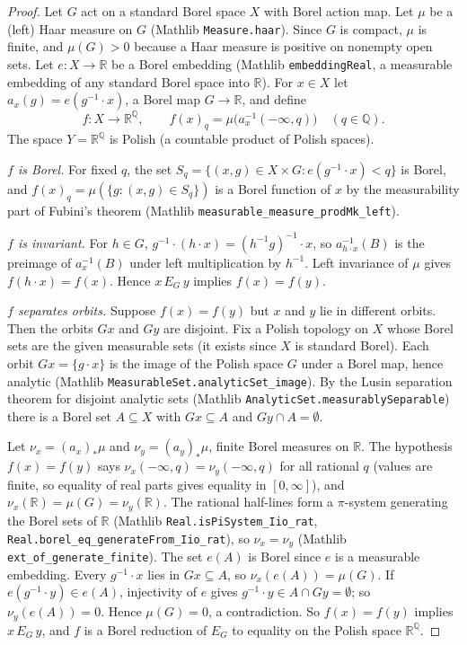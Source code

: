 \documentclass[11pt]{article}
\theoremstyle{definition}
\begin{document}
\begin{proof}
Let $G$ act on a standard Borel space $X$ with Borel action map. Let $\mu$ be a (left) Haar measure
on $G$ (Mathlib \texttt{Measure.haar}). Since $G$ is compact, $\mu$ is finite, and $\mu(G)>0$
because a Haar measure is positive on nonempty open sets. Let $e:X\to\mathbb R$ be a Borel embedding
(Mathlib \texttt{embeddingReal}, a measurable embedding of any standard Borel space into
$\mathbb R$). For $x\in X$ let $a_x(g)=e(g^{-1}\cdot x)$, a Borel map $G\to\mathbb R$, and define
\[
  f:X\to\mathbb R^{\mathbb Q},\qquad f(x)_q=\mu\bigl(a_x^{-1}(-\infty,q)\bigr)\quad(q\in\mathbb Q).
\]
The space $Y=\mathbb R^{\mathbb Q}$ is Polish (a countable product of Polish spaces).

\emph{$f$ is Borel.} For fixed $q$, the set $S_q=\{(x,g)\in X\times G: e(g^{-1}\cdot x)<q\}$ is
Borel, and $f(x)_q=\mu(\{g:(x,g)\in S_q\})$ is a Borel function of $x$ by the measurability part of
Fubini's theorem (Mathlib \texttt{measurable\_measure\_prodMk\_left}).

\emph{$f$ is invariant.} For $h\in G$, $g^{-1}\cdot(h\cdot x)=(h^{-1}g)^{-1}\cdot x$, so
$a_{h\cdot x}^{-1}(B)$ is the preimage of $a_x^{-1}(B)$ under left multiplication by $h^{-1}$.
Left invariance of $\mu$ gives $f(h\cdot x)=f(x)$. Hence $x\,E_G\,y$ implies $f(x)=f(y)$.

\emph{$f$ separates orbits.} Suppose $f(x)=f(y)$ but $x$ and $y$ lie in different orbits. Then the
orbits $Gx$ and $Gy$ are disjoint. Fix a Polish topology on $X$ whose Borel sets are the given
measurable sets (it exists since $X$ is standard Borel). Each orbit $Gx=\{g\cdot x\}$ is the image of
the Polish space $G$ under a Borel map, hence analytic (Mathlib
\texttt{MeasurableSet.analyticSet\_image}). By the Lusin separation theorem for disjoint analytic
sets (Mathlib \texttt{AnalyticSet.measurablySeparable}) there is a Borel set $A\subseteq X$ with
$Gx\subseteq A$ and $Gy\cap A=\emptyset$.

Let $\nu_x=(a_x)_*\mu$ and $\nu_y=(a_y)_*\mu$, finite Borel measures on $\mathbb R$. The hypothesis
$f(x)=f(y)$ says $\nu_x(-\infty,q)=\nu_y(-\infty,q)$ for all rational $q$ (values are finite, so
equality of real parts gives equality in $[0,\infty]$), and $\nu_x(\mathbb R)=\mu(G)=\nu_y(\mathbb R)$.
The rational half-lines form a $\pi$-system generating the Borel sets of $\mathbb R$ (Mathlib
\texttt{Real.isPiSystem\_Iio\_rat}, \texttt{Real.borel\_eq\_generateFrom\_Iio\_rat}), so
$\nu_x=\nu_y$ (Mathlib \texttt{ext\_of\_generate\_finite}). The set $e(A)$ is Borel since $e$ is a
measurable embedding. Every $g^{-1}\cdot x$ lies in $Gx\subseteq A$, so $\nu_x(e(A))=\mu(G)$. If
$e(g^{-1}\cdot y)\in e(A)$, injectivity of $e$ gives $g^{-1}\cdot y\in A\cap Gy=\emptyset$; so
$\nu_y(e(A))=0$. Hence $\mu(G)=0$, a contradiction. So $f(x)=f(y)$ implies $x\,E_G\,y$, and $f$ is a
Borel reduction of $E_G$ to equality on the Polish space $\mathbb R^{\mathbb Q}$.
\end{proof}
\end{document}
